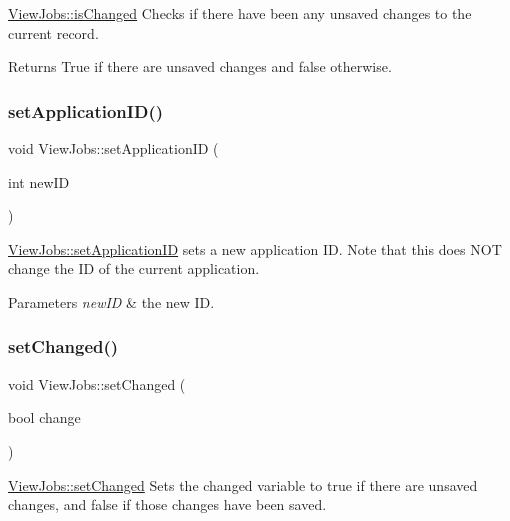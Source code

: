 \mbox{\hyperlink{class_view_jobs_a5f75b45d28ce7f4a8050ce9ce0f44350}{View\+Jobs\+::is\+Changed}} Checks if there have been any unsaved changes to the current record. 

\begin{DoxyReturn}{Returns}
True if there are unsaved changes and false otherwise. 
\end{DoxyReturn}
\mbox{\label{class_view_jobs_acd43a8c32ab9bca7e40ecc99e51da9b8}} 
\subsubsection{\texorpdfstring{set\+Application\+I\+D()}{setApplicationID()}}
{\footnotesize\ttfamily void View\+Jobs\+::set\+Application\+ID (\begin{DoxyParamCaption}\item[{int}]{new\+ID }\end{DoxyParamCaption})}



\mbox{\hyperlink{class_view_jobs_acd43a8c32ab9bca7e40ecc99e51da9b8}{View\+Jobs\+::set\+Application\+ID}} sets a new application ID. Note that this does N\+OT change the ID of the current application. 


\begin{DoxyParams}{Parameters}
{\em new\+ID} & the new ID. \\
\hline
\end{DoxyParams}
\mbox{\label{class_view_jobs_a3cba868c6deadaf4b35c18982f7ec35e}} 
\subsubsection{\texorpdfstring{set\+Changed()}{setChanged()}}
{\footnotesize\ttfamily void View\+Jobs\+::set\+Changed (\begin{DoxyParamCaption}\item[{bool}]{change }\end{DoxyParamCaption})}



\mbox{\hyperlink{class_view_jobs_a3cba868c6deadaf4b35c18982f7ec35e}{View\+Jobs\+::set\+Changed}} Sets the changed variable to true if there are unsaved changes, and false if those changes have been saved. 


